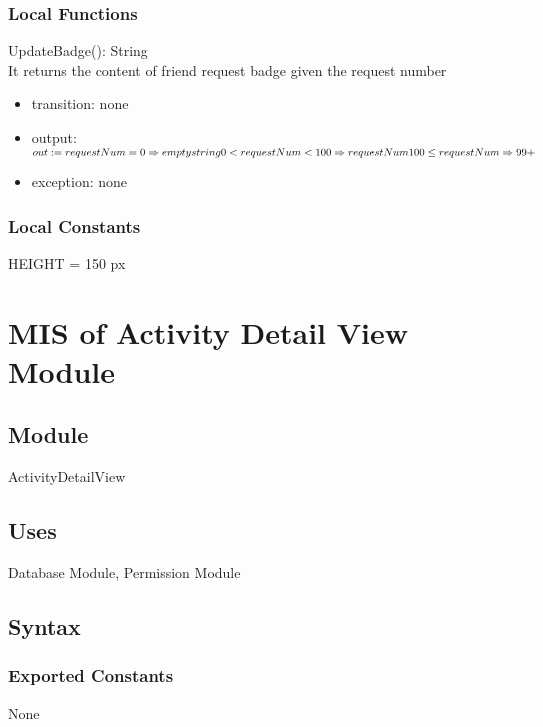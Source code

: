 \documentclass[12pt, titlepage]{article}
\begin{document}
\subsubsection{Local Functions}

\noindent UpdateBadge(): String\\
It returns the content of friend request badge given the request number
\begin{itemize}
\item transition: none
\item output: $out := requestNum = 0 \Rightarrow empty string \\ 0 < requestNum < 100 \Rightarrow requestNum\\ 100 \leq requestNum \Rightarrow 99+$
\item exception: none
\end{itemize}

\subsubsection{Local Constants}
HEIGHT = 150 px

\newpage

\section{MIS of Activity Detail View Module} \label{mADV}

\subsection{Module}

ActivityDetailView

\subsection{Uses}

Database Module, Permission Module

\subsection{Syntax}

\subsubsection{Exported Constants}

None
\end{document}
